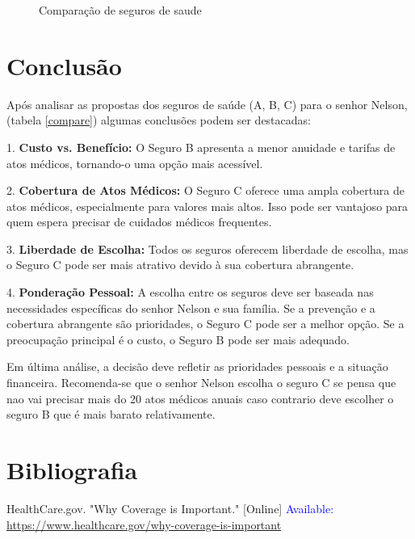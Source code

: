 \documentclass[10pt,a4paper]{article}
\begin{document}
\begin{figure}[!ht]
	\caption{Comparação de seguros de saude}
\end{figure}

\newpage
\section{Conclusão}

Após analisar as propostas dos seguros de saúde (A, B, C) para o senhor Nelson, (tabela \ref{compare}) algumas conclusões podem ser destacadas:

1. \textbf{Custo vs. Benefício:} O Seguro B apresenta a menor anuidade e tarifas de atos médicos, tornando-o uma opção mais acessível.

2. \textbf{Cobertura de Atos Médicos:} O Seguro C oferece uma ampla cobertura de atos médicos, especialmente para valores mais altos. Isso pode ser vantajoso para quem espera precisar de cuidados médicos frequentes.

3. \textbf{Liberdade de Escolha:} Todos os seguros oferecem liberdade de escolha, mas o Seguro C pode ser mais atrativo devido à sua cobertura abrangente.

4. \textbf{Ponderação Pessoal:} A escolha entre os seguros deve ser baseada nas necessidades específicas do senhor Nelson e sua família. Se a prevenção e a cobertura abrangente são prioridades, o Seguro C pode ser a melhor opção. Se a preocupação principal é o custo, o Seguro B pode ser mais adequado.

Em última análise, a decisão deve refletir as prioridades pessoais e a situação financeira. Recomenda-se que o senhor Nelson escolha o seguro C se pensa que nao vai precisar mais do 20 atos médicos anuais caso contrario deve escolher o seguro B que é mais barato relativamente.



\section{Bibliografia}
\begin{thebibliography}{9}
    HealthCare.gov. "Why Coverage is Important." [Online]
    \textcolor{blue}{
    Available: \url{https://www.healthcare.gov/why-coverage-is-important}}
\end{thebibliography}

\printindex
\end{document}
